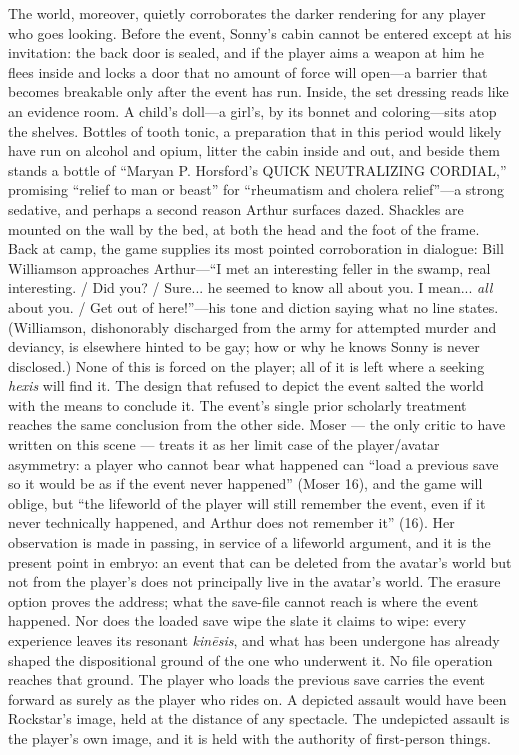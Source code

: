 \documentclass{article}
\begin{document}
The world, moreover, quietly corroborates the darker rendering for any player who goes looking. Before the event, Sonny's cabin cannot be entered except at his invitation: the back door is sealed, and if the player aims a weapon at him he flees inside and locks a door that no amount of force will open---a barrier that becomes breakable only after the event has run. Inside, the set dressing reads like an evidence room. A child's doll---a girl's, by its bonnet and coloring---sits atop the shelves. Bottles of tooth tonic, a preparation that in this period would likely have run on alcohol and opium, litter the cabin inside and out, and beside them stands a bottle of ``Maryan P. Horsford's QUICK NEUTRALIZING CORDIAL,'' promising ``relief to man or beast'' for ``rheumatism and cholera relief''---a strong sedative, and perhaps a second reason Arthur surfaces dazed. Shackles are mounted on the wall by the bed, at both the head and the foot of the frame. Back at camp, the game supplies its most pointed corroboration in dialogue: Bill Williamson approaches Arthur---``I met an interesting feller in the swamp, real interesting. / Did you? / Sure... he seemed to know all about you. I mean... \textit{all} about you. / Get out of here!''---his tone and diction saying what no line states. (Williamson, dishonorably discharged from the army for attempted murder and deviancy, is elsewhere hinted to be gay; how or why he knows Sonny is never disclosed.) None of this is forced on the player; all of it is left where a seeking \textit{hexis} will find it. The design that refused to depict the event salted the world with the means to conclude it.
The event's single prior scholarly treatment reaches the same conclusion from the other side. Moser — the only critic to have written on this scene — treats it as her limit case of the player/avatar asymmetry: a player who cannot bear what happened can ``load a previous save so it would be as if the event never happened'' (Moser 16), and the game will oblige, but ``the lifeworld of the player will still remember the event, even if it never technically happened, and Arthur does not remember it'' (16). Her observation is made in passing, in service of a lifeworld argument, and it is the present point in embryo: an event that can be deleted from the avatar's world but not from the player's does not principally live in the avatar's world. The erasure option proves the address; what the save-file cannot reach is where the event happened. Nor does the loaded save wipe the slate it claims to wipe: every experience leaves its resonant \textit{kinēsis}, and what has been undergone has already shaped the dispositional ground of the one who underwent it. No file operation reaches that ground. The player who loads the previous save carries the event forward as surely as the player who rides on. A depicted assault would have been Rockstar's image, held at the distance of any spectacle. The undepicted assault is the player's own image, and it is held with the authority of first-person things.
\end{document}
